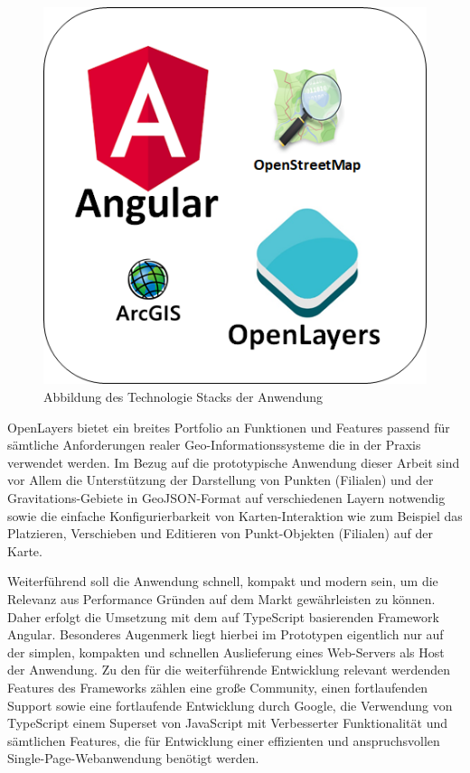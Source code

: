 \begin{figure}[H]
	\centering
	\includegraphics[]{resources/images/tech_stack}
	\caption{Abbildung des Technologie Stacks der Anwendung}
	\label{img:tech_stack}
\end{figure}

OpenLayers bietet ein breites Portfolio an Funktionen und Features passend für sämtliche Anforderungen realer Geo-Informationssysteme die in der Praxis verwendet werden. Im Bezug auf die prototypische Anwendung dieser Arbeit sind vor Allem die Unterstützung der Darstellung von Punkten (Filialen) und der Gravitations-Gebiete in GeoJSON-Format auf verschiedenen Layern notwendig sowie die einfache Konfigurierbarkeit von Karten-Interaktion wie zum Beispiel das Platzieren, Verschieben und Editieren von Punkt-Objekten (Filialen) auf der Karte.

Weiterführend soll die Anwendung schnell, kompakt und modern sein, um die Relevanz aus Performance Gründen auf dem Markt gewährleisten zu können. Daher erfolgt die Umsetzung mit dem auf TypeScript basierenden Framework Angular. Besonderes Augenmerk liegt hierbei im Prototypen eigentlich nur auf der simplen, kompakten und schnellen Auslieferung eines Web-Servers als Host der Anwendung. Zu den für die weiterführende Entwicklung relevant werdenden Features des Frameworks zählen eine große Community, einen fortlaufenden Support sowie eine fortlaufende Entwicklung durch Google, die Verwendung von TypeScript einem Superset von JavaScript mit Verbesserter Funktionalität und sämtlichen Features, die für Entwicklung einer effizienten und anspruchsvollen Single-Page-Webanwendung benötigt werden. 